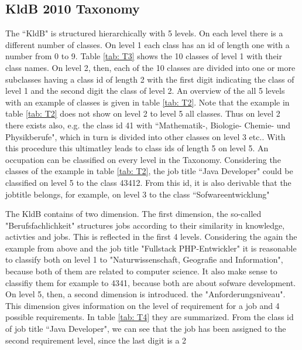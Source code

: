 \documentclass[12pt, a4paper, titlepage]{article}
\begin{document}
\subsection{KldB 2010 Taxonomy}
The ``\ac{KldB}" is structured hierarchically with 5 levels. On each level there is a different number of classes. On level 1 each class has an id of length one with a number from 0 to 9. Table \ref{tab: T3} shows the 10 classes of level 1 with their class names. On level 2, then, each of the 10 classes are divided into one or more subclasses having a class id of length 2 with the first digit indicating the class of level 1 and the second digit the class of level 2. An overview of the all 5 levels with an example of classes is given in table \ref{tab: T2}. Note that the example in table \ref{tab: T2} does not show on level 2 to level 5 all classes. Thus on level 2 there exists also, e.g. the class id 41 with ``Mathematik-, Biologie- Chemie- und Physikberufe", which in turn is divided into other classes on level 3 etc..  With this procedure this ultimatley leads to class ids of length 5 on level 5. An occupation can be classified on every level in the Taxonomy. Considering the classes of the example in table \ref{tab: T2}, the job title ``Java Developer" could  be classified on level 5 to the class 43412. From this id, it is also derivable that the jobtitle belongs, for example, on level 3 to the class ``Sofwareentwicklung" \citep{Bundesagentur2011a, Bundesagentur2011b, Paulus2013}

The \ac{KldB} contains of two dimension. The first dimension, the so-called "Berufsfachlichkeit" structures jobs according to their similarity in knowledge, activties and jobs. This is reflected in the first 4 levels. Considering the again the example from above and the job title "Fullstack PHP-Entwickler" it is reasonable to classify both on level 1 to "Naturwissenschaft, Geografie and Information", because both of them are related to computer science. It also make sense to classifiy them for example to 4341, because both are about sofware development. On level 5, then, a second dimension is introduced. the "Anforderungsniveau". This dimension gives information on the level of requirement for a job and 4 possible requirements. In table \ref{tab: T4} they are summarized. From the class id of job title ``Java Developer", we can see that the job has been assigned to the second requirement level, since the last digit is a 2 \citep{Bundesagentur2011a,Bundesagentur2011b,Paulus2013}
\end{document}
